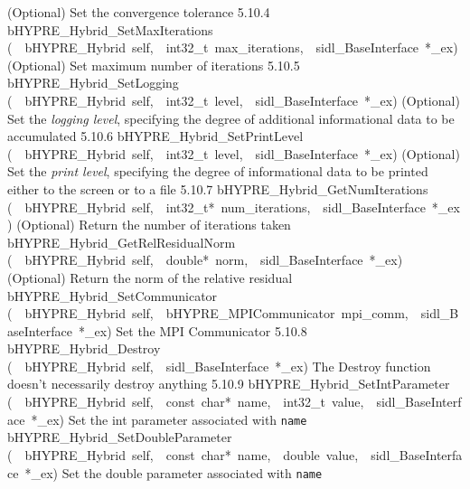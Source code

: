\documentclass{article}
\begin{document}
\begin{cxxentry}
\begin{cxxentry}
\begin{cxxnames}
        {
(Optional) Set the convergence tolerance}
        {5.10.4}
        {bHYPRE\_Hybrid\_SetMaxIterations}
        {(\ \ bHYPRE\_Hybrid\ self,\ \ int32\_t\ max\_iterations,\ \ sidl\_BaseInterface\ *\_ex)}
        {
(Optional) Set maximum number of iterations}
        {5.10.5}
        {bHYPRE\_Hybrid\_SetLogging}
        {(\ \ bHYPRE\_Hybrid\ self,\ \ int32\_t\ level,\ \ sidl\_BaseInterface\ *\_ex)}
        {
(Optional) Set the {\it logging level}, specifying the degree
of additional informational data to be accumulated}
        {5.10.6}
        {bHYPRE\_Hybrid\_SetPrintLevel}
        {(\ \ bHYPRE\_Hybrid\ self,\ \ int32\_t\ level,\ \ sidl\_BaseInterface\ *\_ex)}
        {
(Optional) Set the {\it print level}, specifying the degree
of informational data to be printed either to the screen or
to a file}
        {5.10.7}
        {bHYPRE\_Hybrid\_GetNumIterations}
        {(\ \ bHYPRE\_Hybrid\ self,\ \ int32\_t*\ num\_iterations,\ \ sidl\_BaseInterface\ *\_ex)}
        {
(Optional) Return the number of iterations taken}
        {}
\label{cxx.5.10.17}
        {bHYPRE\_Hybrid\_GetRelResidualNorm}
        {(\ \ bHYPRE\_Hybrid\ self,\ \ double*\ norm,\ \ sidl\_BaseInterface\ *\_ex)}
        {
(Optional) Return the norm of the relative residual}
        {}
\label{cxx.5.10.18}
        {bHYPRE\_Hybrid\_SetCommunicator}
        {(\ \ bHYPRE\_Hybrid\ self,\ \ bHYPRE\_MPICommunicator\ mpi\_comm,\ \ sidl\_BaseInterface\ *\_ex)}
        {
Set the MPI Communicator}
        {5.10.8}
        {bHYPRE\_Hybrid\_Destroy}
        {(\ \ bHYPRE\_Hybrid\ self,\ \ sidl\_BaseInterface\ *\_ex)}
        {
The Destroy function doesn't necessarily destroy anything}
        {5.10.9}
        {bHYPRE\_Hybrid\_SetIntParameter}
        {(\ \ bHYPRE\_Hybrid\ self,\ \ const\ char*\ name,\ \ int32\_t\ value,\ \ sidl\_BaseInterface\ *\_ex)}
        {
Set the int parameter associated with {\tt name}}
        {}
\label{cxx.5.10.19}
        {bHYPRE\_Hybrid\_SetDoubleParameter}
        {(\ \ bHYPRE\_Hybrid\ self,\ \ const\ char*\ name,\ \ double\ value,\ \ sidl\_BaseInterface\ *\_ex)}
        {
Set the double parameter associated with {\tt name}}
        {}
\label{cxx.5.10.20}

\end{cxxnames}
\end{cxxentry}
\end{cxxentry}
\end{document}
